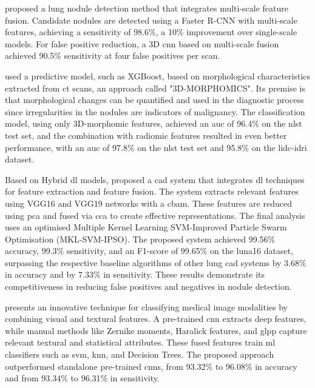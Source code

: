 \textcite{zhao_pulmonary_2022} proposed a lung nodule detection method that integrates multi-scale feature fusion. Candidate nodules are detected using a Faster R-CNN with multi-scale features, achieving a sensitivity of 98.6\%, a 10\% improvement over single-scale models. For false positive reduction, a 3D \ac{cnn} based on multi-scale fusion achieved 90.5\% sensitivity at four false positives per scan.

\textcite{munoz_3d-morphomics_2022} used a predictive model, such as XGBoost, based on morphological characteristics extracted from \ac{ct} scans, an approach called "3D-MORPHOMICS". Its premise is that morphological changes can be quantified and used in the diagnostic process since irregularities in the nodules are indicators of malignancy. The classification model, using only 3D-morphomic features, achieved an \ac{auc} of 96.4\% on the \ac{nlst} test set, and the combination with radiomic features resulted in even better performance, with an \ac{auc} of 97.8\% on the \ac{nlst} test set and 95.8\% on the \ac{lidc-idri} dataset.

Based on Hybrid \ac{dl} models, \textcite{li_research_2022} proposed a \ac{cad} system that integrates \ac{dl} techniques for feature extraction and feature fusion. The system extracts relevant features using VGG16 and VGG19 networks with a \ac{cbam}. These features are reduced using \ac{pca} and fused via \ac{cca} to create effective representations. The final analysis uses an optimised Multiple Kernel Learning SVM-Improved Particle Swarm Optimisation (MKL-SVM-IPSO). The proposed system achieved 99.56\% accuracy, 99.3\% sensitivity, and an F1-score of 99.65\% on the \ac{luna16} dataset, surpassing the respective baseline algorithms of other lung \ac{cad} systems by 3.68\% in accuracy and by 7.33\% in sensitivity. These results demonstrate its competitiveness in reducing false positives and negatives in nodule detection.

\textcite{iqbal_fusion_2023} presents an innovative technique for classifying medical image modalities by combining visual and textural features. A pre-trained \ac{cnn} extracts deep features, while manual methods like Zernike moments, Haralick features, and \ac{glpp} capture relevant textural and statistical attributes. These fused features train \ac{ml} classifiers such as \ac{svm}, \ac{knn}, and Decision Trees. The proposed approach outperformed standalone pre-trained \acp{cnn}, from 93.32\% to 96.08\% in accuracy and from 93.34\% to 96.31\% in sensitivity.

